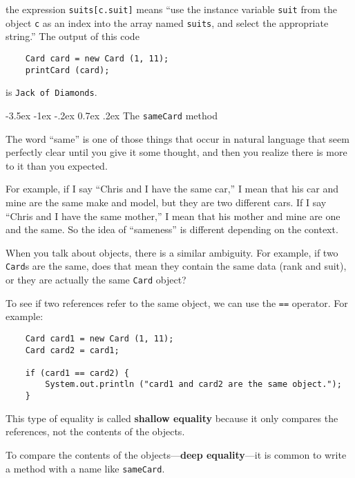 \documentclass{book}
\makeatletter
\renewcommand{\section}{\@startsection 
    {section} {1} {0mm}%
    {-3.5ex \@plus -1ex \@minus -.2ex}%
    {0.7ex \@plus.2ex}%
    {\normalfont\Large\bfseries}}
\makeatother
\begin{document}
the expression {\tt suits[c.suit]} means ``use the instance variable
{\tt suit} from the object {\tt c} as an index into the array named
{\tt suits}, and select the appropriate string.''  The output of this
code

\begin{verbatim}
    Card card = new Card (1, 11);
    printCard (card);
\end{verbatim}
%
is {\tt Jack of Diamonds}.

\section{The {\tt sameCard} method}

The word ``same'' is one of those things that occur in natural
language that seem perfectly clear until you give it some thought,
and then you realize there is more to it than you expected.


For example, if I say ``Chris and I have the same car,'' I
mean that his car and mine are the same make and model, but they are
two different cars.  If I say ``Chris and I have the same mother,'' I
mean that his mother and mine are one and the same.  So the
idea of ``sameness'' is different depending on the context.

When you talk about objects, there is a similar ambiguity.  For
example, if two {\tt Card}s are the same, does that mean they
contain the same data (rank and suit), or they are actually
the same {\tt Card} object?

To see if two references refer to the same object, we can use
the {\tt ==} operator.  For example:

\begin{verbatim}
    Card card1 = new Card (1, 11);
    Card card2 = card1;

    if (card1 == card2) {
        System.out.println ("card1 and card2 are the same object.");
    }
\end{verbatim}
%
This type of equality is called {\bf shallow equality} because
it only compares the references, not the contents of the objects.


To compare the contents of the objects---{\bf deep equality}---it
is common to write a method with a name like {\tt sameCard}.
\end{document}
